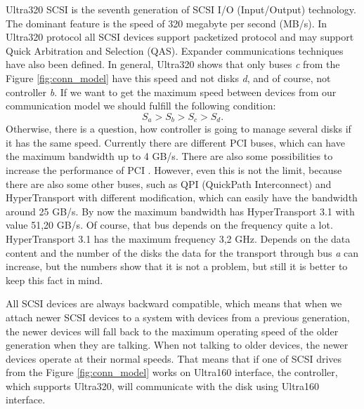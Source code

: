 Ultra320 SCSI \cite{ultra320} is the seventh generation of SCSI I/O (Input/Output) technology. The dominant feature is the speed of 320 megabyte per second (MB/s). In Ultra320 protocol all SCSI devices support packetized protocol and may support Quick Arbitration and Selection (QAS). Expander communications techniques have also been defined. In general, Ultra320 shows that only buses \emph{c} from the Figure \ref{fig:conn_model} have this speed and not disks \emph{d}, and of course, not controller \emph{b}. If we want to get the maximum speed between devices from our communication model we should fulfill the following condition:
\begin{equation}
	S_a > S_b > S_c > S_d.
\end{equation}
Otherwise, there is a question, how controller is going to manage several disks if it has the same speed.
Currently there are different PCI buses, which can have the maximum bandwidth up to 4 GB/s. There are also some possibilities to increase the performance of PCI \cite{increase_pci}. However, even this is not the limit, because there are also some other buses, such as QPI (QuickPath Interconnect) and HyperTransport with different modification, which can easily have the bandwidth around 25 GB/s. By now the maximum bandwidth has HyperTransport 3.1 with value 51,20 GB/s. Of course, that bus depends on the frequency quite a lot. HyperTransport 3.1 has the maximum frequency 3,2 GHz. Depends on the data content and the number of the disks the data for the transport through bus \emph{a} can increase, but the numbers show that it is not a problem, but still it is better to keep this fact in mind.



All SCSI devices are always backward compatible, which means that when we attach newer SCSI devices to a system with devices from a previous generation, the newer devices will fall back to the maximum operating speed of the older generation when they are talking. When not talking to older devices, the newer devices operate at their normal speeds. That means that if one of SCSI drives from the Figure \ref{fig:conn_model} works on Ultra160 interface, the controller, which supports Ultra320, will communicate with the disk using Ultra160 interface.

